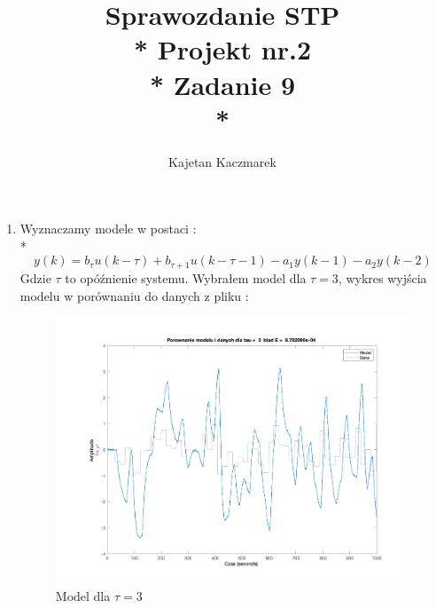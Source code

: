 \documentclass[a4paper, 11pt]{article}
\author{Kajetan Kaczmarek}
\begin{document}
\title{Sprawozdanie STP \\* Projekt nr.2 \\* 
Zadanie 9 \\*}
\maketitle
\begin{enumerate}
\item Wyznaczamy modele w postaci : \\*
\[  y(k) = b_{\tau}u(k-\tau) +  b_{\tau+1}u(k-\tau -1) -a_1y(k-1)-a_2y(k-2)  \]
Gdzie \(\tau\) to opóźnienie systemu.
Wybrałem model dla \(\tau = 3\), wykres wyjścia modelu w porównaniu do danych z pliku : 
\begin{figure} [h]
\centering
\includegraphics[width=\linewidth]{./ModelsP1/modelTau3.png}
\caption[Model dla \(\tau = 3\) ]
{Model dla \(\tau = 3\)}
\end{figure}


\end{enumerate}
\end{document}
